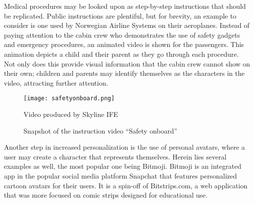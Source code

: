 Medical procedures may be looked upon as step-by-step instructions that should be replicated. Public instructions are plentiful, but for brevity, an example to consider is one used by Norwegian Airline Systems on their aeroplanes. Instead of paying attention to the cabin crew who demonstrates the use of safety gadgets and emergency procedures, an animated video \parencite{norwegianairshuttle2012} is shown for the passengers. This animation depicts a child and their parent as they go through each procedure. Not only does this provide visual information that the cabin crew cannot show on their own; children and parents may identify themselves as the characters in the video, attracting further attention.

\begin{figure}
    \centering
    \texttt{[image: safetyonboard.png]}
    \caption{Snapshot of the instruction video \enquote{Safety onboard}}
    Video produced by Skyline IFE
    \label{fig:safetyonboard}
\end{figure}

Another step in increased personalization is the use of personal avatars, where a user may create a character that represents themselves. Herein lies several examples as well, the most popular one being Bitmoji. Bitmoji is an integrated app in the popular social media platform Snapchat that features personalized cartoon avatars for their users. It is a spin-off of Bitstrips.com, a web application that was more focused on comic strips designed for educational use. %
